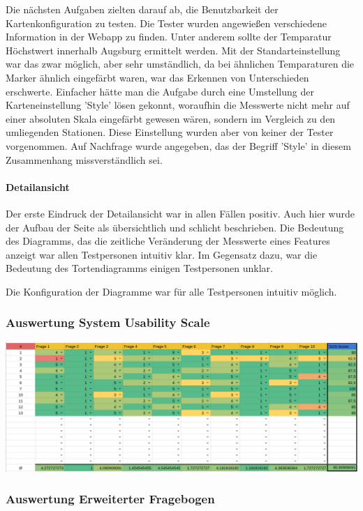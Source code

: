         Die nächsten Aufgaben zielten darauf ab, die Benutzbarkeit der Kartenkonfiguration zu testen. Die Tester wurden angewießen verschiedene Information in der Webapp zu finden. Unter anderem sollte der Temparatur Höchstwert innerhalb Augsburg ermittelt werden. Mit der Standarteinstellung war das zwar möglich, aber sehr umständlich, da bei ähnlichen Temparaturen die Marker ähnlich eingefärbt waren, war das Erkennen von Unterschieden erschwerte.
        Einfacher hätte man die Aufgabe durch eine Umstellung der Karteneinstellung 'Style' lösen gekonnt, woraufhin die Messwerte nicht mehr auf einer absoluten Skala eingefärbt gewesen wären, sondern im Vergleich zu den umliegenden Stationen. Diese Einstellung wurden aber von keiner der Tester vorgenommen. Auf Nachfrage wurde angegeben, das der Begriff 'Style' in diesem Zusammenhang missverständlich sei.
     
      \paragraph{Detailansicht}
        Der erste Eindruck der Detailansicht war in allen Fällen positiv. Auch hier wurde der Aufbau der Seite als übersichtlich und schlicht beschrieben.
        Die Bedeutung des Diagramms, das die zeitliche Veränderung der Messwerte eines \glspl{Feature} anzeigt war allen Testpersonen intuitiv klar. Im Gegensatz dazu, war die Bedeutung des Tortendiagramms einigen Testpersonen unklar.
        
        Die Konfiguration der Diagramme war für alle Testpersonen intuitiv möglich.
     
    \subsubsection{Auswertung System Usability Scale}
      \includegraphics[width=1\linewidth]{figures/sus.png}\par\vspace{1cm}

    \subsubsection{Auswertung Erweiterter Fragebogen}
